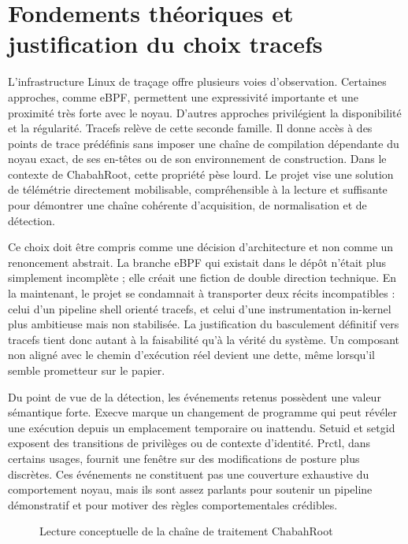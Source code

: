 \documentclass[12pt,a4paper]{report}
\begin{document}
\chapter{Fondements théoriques et justification du choix tracefs}
L’infrastructure Linux de traçage offre plusieurs voies d’observation. Certaines approches, comme eBPF, permettent une expressivité importante et une proximité très forte avec le noyau. D’autres approches privilégient la disponibilité et la régularité. Tracefs relève de cette seconde famille. Il donne accès à des points de trace prédéfinis sans imposer une chaîne de compilation dépendante du noyau exact, de ses en-têtes ou de son environnement de construction. Dans le contexte de ChabahRoot, cette propriété pèse lourd. Le projet vise une solution de télémétrie directement mobilisable, compréhensible à la lecture et suffisante pour démontrer une chaîne cohérente d’acquisition, de normalisation et de détection.

Ce choix doit être compris comme une décision d’architecture et non comme un renoncement abstrait. La branche eBPF qui existait dans le dépôt n’était plus simplement incomplète ; elle créait une fiction de double direction technique. En la maintenant, le projet se condamnait à transporter deux récits incompatibles : celui d’un pipeline shell orienté tracefs, et celui d’une instrumentation in-kernel plus ambitieuse mais non stabilisée. La justification du basculement définitif vers tracefs tient donc autant à la faisabilité qu’à la vérité du système. Un composant non aligné avec le chemin d’exécution réel devient une dette, même lorsqu’il semble prometteur sur le papier.

Du point de vue de la détection, les événements retenus possèdent une valeur sémantique forte. Execve marque un changement de programme qui peut révéler une exécution depuis un emplacement temporaire ou inattendu. Setuid et setgid exposent des transitions de privilèges ou de contexte d’identité. Prctl, dans certains usages, fournit une fenêtre sur des modifications de posture plus discrètes. Ces événements ne constituent pas une couverture exhaustive du comportement noyau, mais ils sont assez parlants pour soutenir un pipeline démonstratif et pour motiver des règles comportementales crédibles.

\begin{figure}[h]
\centering
{}
\caption{Lecture conceptuelle de la chaîne de traitement ChabahRoot}
\end{figure}
\end{document}
